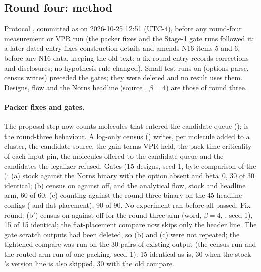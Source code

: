 
\subsection{Round four: method}
\label{sec:r4-method}
Protocol , committed as  on 2026-10-25 12:51 (UTC-4), before any round-four
measurement or VPR run (the packer fixes and the Stage-1 gate runs followed it; a later dated entry fixes construction details
and amends N16 items 5 and 6, before any N16 data, keeping the old text; a fix-round entry records corrections and disclosures; no hypothesis rule changed). Small test runs on  (options parse, census writes) preceded the gates; they were deleted and no result uses them. Designs, flow and the Norns headline (source , $\beta=4$) are those of round three.

\paragraph{Packer fixes and gates.} The proposal step now counts molecules that entered the candidate queue
();  is the round-three behaviour. A log-only census
() writes, per molecule added to a cluster, the candidate source, the gain terms VPR held, the
pack-time criticality of each input pin, the molecules offered to the candidate queue and the candidates the legalizer refused. Gates
(15 designs, seed 1, byte comparison of the ): (a) stock against the Norns binary with the option absent and beta~0, 30 of 30 identical;
(b) census on against off,  and the analytical flow, stock and headline arm, 60 of 60;
(c)  counting against the round-three binary on the 45 headline configs ( and flat placement), 90 of 90.
No experiment ran before all passed. Fix round: (b$'$) census on against off for the round-three  arm (word, $\beta=4$, , seed 1), 15 of 15 identical; the flat-placement compare now skips only the  header line. The gate scratch outputs had been deleted, so (b) and (c) were not repeated; the tightened compare was run on the 30 pairs of existing output (the census run and the routed arm run of one packing, seed 1): 15 identical as is, 30 when the stock 's version line is also skipped, 30 with the old compare.

